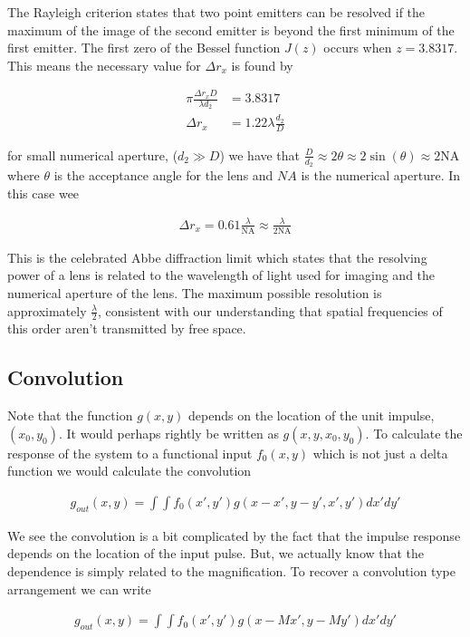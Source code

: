 \documentclass[12pt]{article}
\begin{document}
The Rayleigh criterion states that two point emitters can be resolved if the maximum of the image of the second emitter is beyond the first minimum of the first emitter. The first zero of the Bessel function $J(z)$ occurs when $z = 3.8317$. This means the necessary value for $\Delta r_x$ is found by

\begin{align}
\pi \frac{\Delta r_x D}{\lambda d_2} &= 3.8317\\
\Delta r_x & = 1.22 \lambda \frac{d_2}{D}
\end{align}

for small numerical aperture, ($d_2 \gg D$) we have that $\frac{D}{d_2} \approx 2\theta\approx 2 \sin(\theta) \approx 2\text{NA}$ where $\theta$ is the acceptance angle for the lens and $NA$ is the numerical aperture. In this case wee

\begin{align}
\Delta r_x = 0.61 \frac{\lambda}{\text{NA}} \approx \frac{\lambda}{2\text{NA}}
\end{align}

This is the celebrated Abbe diffraction limit which states that the resolving power of a lens is related to the wavelength of light used for imaging and the numerical aperture of the lens. The maximum possible resolution is approximately $\frac{\lambda}{2}$, consistent with our understanding that spatial frequencies of this order aren't transmitted by free space.

\subsection{Convolution}

Note that the function $g(x,y)$ depends on the location of the unit impulse, $(x_0,y_0)$. It would perhaps rightly be written as $g(x,y,x_0,y_0)$. To calculate the response of the system to a functional input $f_0(x,y)$ which is not just a delta function we would calculate the convolution

\begin{align}
g_{out}(x,y) = \int\int f_0(x',y') g(x-x',y-y',x',y') dx'dy'
\end{align}

We see the convolution is a bit complicated by the fact that the impulse response depends on the location of the input pulse. But, we actually know that the dependence is simply related to the magnification. To recover a convolution type arrangement we can write

\begin{align}
g_{out}(x,y) = \int \int f_0(x',y') g(x-Mx',y-My') dx' dy'
\end{align}
\end{document}
